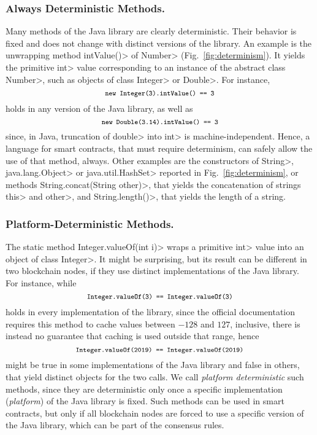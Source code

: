 \subsubsection*{Always Deterministic Methods.}
Many methods of the Java library are clearly deterministic. Their behavior is fixed
and does not change with distinct versions of the library. An example is the unwrapping
method \<intValue()> of \<Number> (Fig.~\ref{fig:determinism}). It yields
the primitive \<int> value corresponding to an instance of the abstract class \<Number>, such
as objects of class \<Integer> or \<Double>. For instance,
\[
\<new Integer(3).intValue() == 3>
\]
holds in any version of the Java library, as well as
\[
\<new Double(3.14).intValue() == 3>
\]
since, in Java, truncation of \<double> into \<int> is machine-independent.
Hence, a language for smart contracts, that must require determinism,
can safely allow the use of that method, always. Other examples
are the constructors of \<String>, \<java.lang.Object> or \<java.util.HashSet>
reported in Fig.~\ref{fig:determinism}, or methods
\<String.concat(String other)>, that yields the concatenation of strings \<this> and \<other>,
and \<String.length()>, that yields the length of a string.

\subsubsection*{Platform-Deterministic Methods.}
The static method \<Integer.valueOf(int i)> wraps
a primitive \<int> value into an object of class \<Integer>. It might be surprising,
but its result can be different in two blockchain nodes, if they
use distinct implementations of the Java library. For instance, while
\[
\<Integer.valueOf(3) == Integer.valueOf(3)>
\]
holds in every implementation of the library, since the official documentation requires this method
to cache values between $-128$ and $127$, inclusive, there is instead no guarantee that caching is
used outside that range, hence
\[
\<Integer.valueOf(2019) == Integer.valueOf(2019)>
\]
might be true in some implementations of the Java library
and false in others, that yield distinct objects for the two calls.
We call \emph{platform deterministic} such methods, since they are deterministic only once a specific
implementation (\emph{platform}) of the Java library is fixed. Such methods can be used in smart contracts,
but only if all blockchain nodes are forced to
use a specific version of the Java library, which can be part of the consensus rules.

